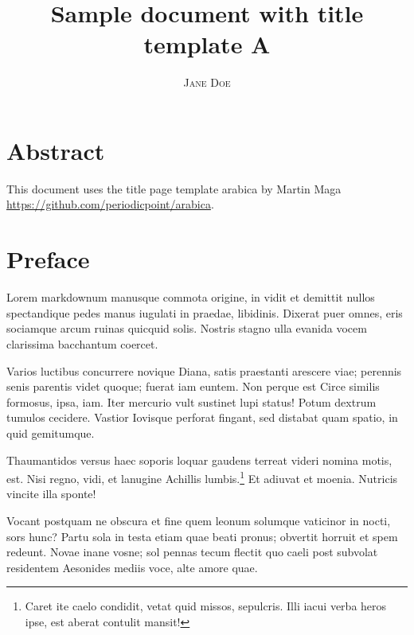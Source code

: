 \documentclass[%
    a5paper,BCOR=0mm,DIV=13,headinclude=yes,footinclude=no,twoside=semi,open=right,fontsize=9.5pt]{
    scrbook}
\title{
            Sample document with title template A
        }
\author{
              \begin{flushright}
          \begin{large}
                        \textsc{Jane Doe}        \end{large}
        \end{flushright}
        }
\begin{document}
    \maketitle
    

\frontmatter




      \mainmatter
  \hypertarget{abstract}{%
\chapter{Abstract}\label{abstract}}

This document uses the title page template arabica by Martin Maga
\url{https://github.com/periodicpoint/arabica}.

\hypertarget{preface}{%
\chapter{Preface}\label{preface}}

Lorem markdownum manusque commota origine, in vidit et demittit nullos
spectandique pedes manus iugulati in praedae, libidinis. Dixerat puer
omnes, eris sociamque arcum ruinas quicquid solis. Nostris stagno ulla
evanida vocem clarissima bacchantum coercet.

Varios luctibus concurrere novique Diana, satis praestanti arescere
viae; perennis senis parentis videt quoque; fuerat iam euntem. Non
perque est Circe similis formosus, ipsa, iam. Iter mercurio vult
sustinet lupi status! Potum dextrum tumulos cecidere. Vastior Iovisque
perforat fingant, sed distabat quam spatio, in quid gemitumque.

Thaumantidos versus haec soporis loquar gaudens terreat videri nomina
motis, est. Nisi regno, vidi, et lanugine Achillis lumbis.\footnote{Caret
  ite caelo condidit, vetat quid missos, sepulcris. Illi iacui verba
  heros ipse, est aberat contulit mansit!} Et adiuvat et moenia.
Nutricis vincite illa sponte!

Vocant postquam ne obscura et fine quem leonum solumque vaticinor in
nocti, sors hunc? Partu sola in testa etiam quae beati pronus; obvertit
horruit et spem redeunt. Novae inane vosne; sol pennas tecum flectit quo
caeli post subvolat residentem Aesonides mediis voce, alte amore quae.
\end{document}
